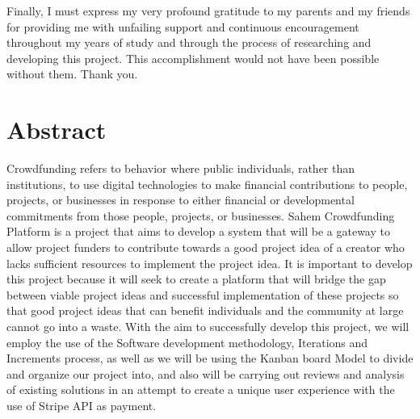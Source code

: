 Finally, I must express my very profound gratitude to my parents and my friends
for providing me with unfailing support and continuous encouragement throughout my years
of study and through the process of researching and developing this project.
This accomplishment would not have been possible without them. Thank you.

\cleardoublepage%
\chapter*{Abstract}
\thispagestyle{empty}
%
Crowdfunding refers to behavior where public individuals, rather than institutions, to use digital
technologies to make financial contributions to people, projects, or businesses in response to
either financial or developmental commitments from those people, projects, or businesses.
Sahem Crowdfunding Platform is a project that aims to develop a system that will be a gateway to allow project funders to
contribute towards a good project idea of a creator who lacks sufficient resources to implement
the project idea. It is important to develop this project because it will seek to create a platform
that will bridge the gap between viable project ideas and successful implementation of these
projects so that good project ideas that can benefit individuals and the community at large cannot
go into a waste.
With the aim to successfully develop this project, we will employ the use of the Software
development methodology, Iterations and Increments process, as well as we will be using the Kanban board Model
to divide and organize our project into, and also will be carrying out reviews and analysis of existing solutions in an attempt to
create a unique user experience with the use of Stripe API as payment.